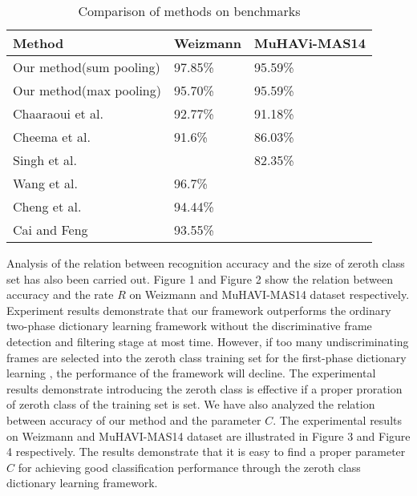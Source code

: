 \documentclass{article}
\begin{document}
\begin{table}[htbp]
  \centering
  \caption{Comparison of methods  on benchmarks}
    \begin{tabular}{p{4.5cm} p{1.5cm} p{1.5cm}}
    \toprule
    Method &  Weizmann &  MuHAVi-MAS14\\
    \midrule
    Our method(sum pooling) & 97.85\% & 95.59\%\\
   Our method(max pooling) & 95.70\% & 95.59\%\\
    Chaaraoui et al. \cite{Chaaraoui2013} & 92.77\% & 91.18\% \\
    Cheema et al. \cite{Cheema}  & 91.6\% & 86.03\%\\
        Singh et al. \cite{Singh}  &  & 82.35\%\\
       Wang et al. \cite{Wang20123902} & 96.7\% &  \\
    Cheng et al. \cite{ChengTIP2015} & 94.44\% &  \\
       Cai and Feng \cite{frftacpr2015} & 93.55\% &  \\
        \bottomrule
    \end{tabular}%
  \label{tab:recresult}%
\end{table}%


 Analysis of the relation between recognition accuracy and  the size of zeroth class set has also been carried out.
  Figure 1 and Figure 2 show the relation between accuracy and the rate $R$  on  Weizmann  and MuHAVI-MAS14 dataset respectively.
 Experiment results demonstrate that our framework outperforms the ordinary two-phase dictionary learning framework without the discriminative frame detection and filtering stage at most time.
However, if too many undiscriminating frames are selected into the zeroth class training set for the first-phase dictionary learning , the performance of the framework  will decline.
The experimental results  demonstrate introducing the zeroth class is  effective  if  a proper proration of zeroth class of the training set is set.
We have also analyzed  the relation between accuracy of our method and the parameter $C$.
The experimental results on Weizmann and  MuHAVI-MAS14 dataset are illustrated in Figure 3 and Figure 4 respectively.
The results demonstrate that it is easy to find a proper parameter $C$ for achieving good classification performance through the zeroth class dictionary learning framework.
\end{document}
